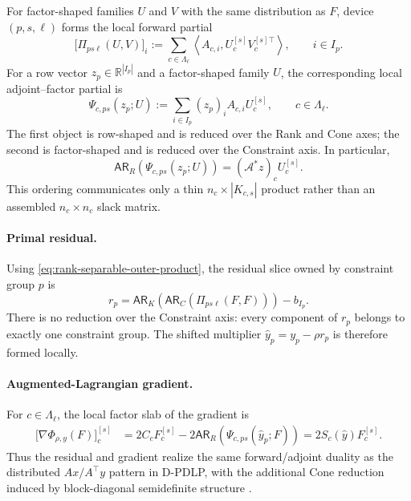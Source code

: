 \documentclass[11pt]{article}
\theoremstyle{definition}
\theoremstyle{remark}
\begin{document}
For factor-shaped families $U$ and $V$ with the same distribution as $F$,
device $(p,s,\ell)$ forms the local forward partial
\begin{equation}
    \bigl[\Pi_{p s\ell}(U,V)\bigr]_i
    :=\sum_{c\in\Lambda_\ell}
      \left\langle A_{c,i},U_c^{[s]}V_c^{[s]\top}\right\rangle,
    \qquad i\in I_p.
\label{eq:local-forward-partial}
\end{equation}
For a row vector $z_p\in\mathbb R^{|I_p|}$ and a factor-shaped family $U$,
the corresponding local adjoint--factor partial is
\begin{equation}
    \Psi_{c,ps}(z_p;U)
    :=\sum_{i\in I_p}(z_p)_i A_{c,i}U_c^{[s]},
    \qquad c\in\Lambda_\ell.
\label{eq:local-adjoint-factor}
\end{equation}
The first object is row-shaped and is reduced over the Rank and Cone axes; the
second is factor-shaped and is reduced over the Constraint axis.  In
particular,
\begin{equation}
    \mathsf{AR}_{R}\!\left(\Psi_{c,ps}(z_p;U)\right)
    =(\mathcal A^*z)_cU_c^{[s]}.
\label{eq:adjoint-factor-identity}
\end{equation}
This ordering communicates only a thin $n_c\times |K_{c,s}|$ product rather
than an assembled $n_c\times n_c$ slack matrix.

\paragraph{Primal residual.}
Using \eqref{eq:rank-separable-outer-product}, the residual slice owned by
constraint group $p$ is
\begin{equation}
    r_p
    =\mathsf{AR}_{K}\!\left(
       \mathsf{AR}_{C}\!\left(\Pi_{p s\ell}(F,F)\right)
      \right)-b_{I_p}.
\label{eq:distributed-primal-residual}
\end{equation}
There is no reduction over the Constraint axis: every component of $r_p$
belongs to exactly one constraint group.  The shifted multiplier
$\widehat y_p=y_p-\rho r_p$ is therefore formed locally.

\paragraph{Augmented-Lagrangian gradient.}
For $c\in\Lambda_\ell$, the local factor slab of the gradient is
\begin{equation}
\begin{aligned}
    \bigl[\nabla\Phi_{\rho,y}(F)\bigr]_c^{[s]}
    &=2C_cF_c^{[s]}
      -2\mathsf{AR}_{R}\!\left(
          \Psi_{c,ps}(\widehat y_p;F)
        \right)=2S_c(\widehat y)F_c^{[s]}.
\end{aligned}
\label{eq:distributed-gradient}
\end{equation}
Thus the residual and gradient realize the same forward/adjoint duality as
the distributed $Ax/A^\top y$ pattern in D-PDLP, with the additional Cone
reduction induced by block-diagonal semidefinite structure
\cite{DPDLP}.
\end{document}
